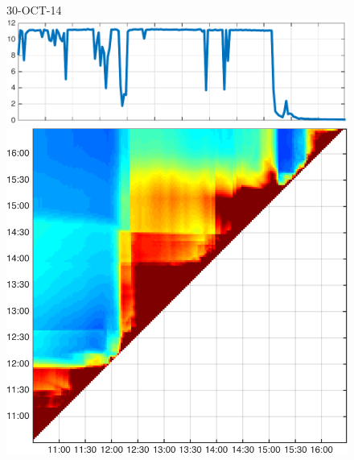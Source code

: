 \begin{figure}
\begin{minipage}[c]{\mylength}
\end{minipage}
\begin{minipage}[c]{\mylength}
\centering \scriptsize 30-OCT-14 \\
\includegraphics[valign=t,trim=0 0 5pt 0,angle=90,origin=tr,width=\sunintwidth,totalheight=\eventheight]{events/20141030-intensity.pdf}
\includegraphics[valign=t,width=\eventswidth]{events/20141030-maxGain-local-events.png}

\end{minipage}
\end{figure}
